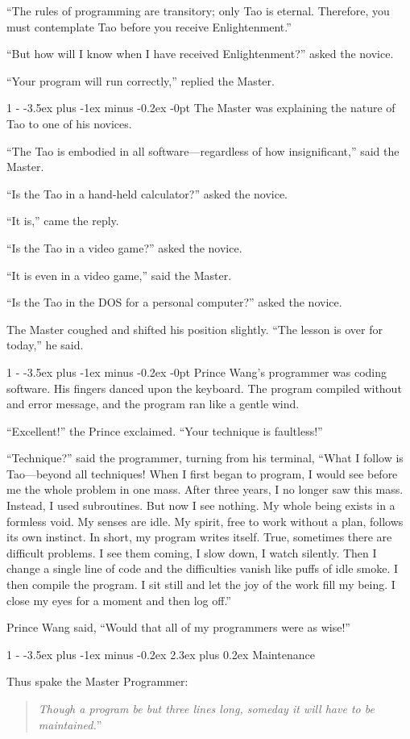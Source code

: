 \documentclass[12pt,letterpaper]{article}
\makeatletter
\newlength{\intomargin}\setlength{\intomargin}{25pt}
\renewcommand{\section}{%
\@startsection{section}%
{1}%
{-\intomargin}%
{-3.5ex plus -1ex minus -0.2ex}%
{2.3ex plus 0.2ex}%
{\normalfont\Large\bfseries}%
}
\renewcommand{\subsection}{%
\@startsection{subsection}%
{1}%
{-\intomargin}%
{-3.5ex plus -1ex minus -0.2ex}%
{-0pt}%
{\normalfont\large\bfseries}%
}
\newcommand{\book}[2]{\section{#1}\par\hspace{-\intomargin}Thus spake the Master Programmer:%
\begin{quotation}\noindent\llap{``}\textsl{#2}''\end{quotation}\medskip}
\newcommand{\sect}{\subsection{}}
\makeatother
\begin{document}
``The rules of programming are transitory; only Tao is
eternal. Therefore, you must contemplate Tao before you receive
Enlightenment.''

``But how will I know when I have received Enlightenment?'' asked the
novice.

``Your program will run correctly,'' replied the Master.

\sect
The Master was explaining the nature of Tao to one of his novices.

``The Tao is embodied in all software---regardless of how
insignificant,'' said the Master.

``Is the Tao in a hand-held calculator?'' asked the novice.

``It is,'' came the reply.

``Is the Tao in a video game?'' asked the novice.

``It is even in a video game,'' said the Master.

``Is the Tao in the DOS for a personal computer?'' asked the novice.

The Master coughed and shifted his position slightly. ``The lesson is
over for today,'' he said.

\sect
Prince Wang's programmer was coding software. His fingers danced upon
the keyboard. The program compiled without and error message, and the
program ran like a gentle wind.

``Excellent!'' the Prince exclaimed. ``Your technique is faultless!''

``Technique?'' said the programmer, turning from his terminal, ``What
I follow is Tao---beyond all techniques! When I first began to
program, I would see before me the whole problem in one mass. After
three years, I no longer saw this mass. Instead, I used
subroutines. But now I see nothing. My whole being exists in a
formless void. My senses are idle. My spirit, free to work without a
plan, follows its own instinct. In short, my program writes
itself. True, sometimes there are difficult problems. I see them
coming, I slow down, I watch silently. Then I change a single line of
code and the difficulties vanish like puffs of idle smoke. I then
compile the program. I sit still and let the joy of the work fill my
being. I close my eyes for a moment and then log off.''

Prince Wang said, ``Would that all of my programmers were as wise!''

\book{Maintenance}%
{Though a program be but three lines long, someday it will
have to be maintained.}
\end{document}
